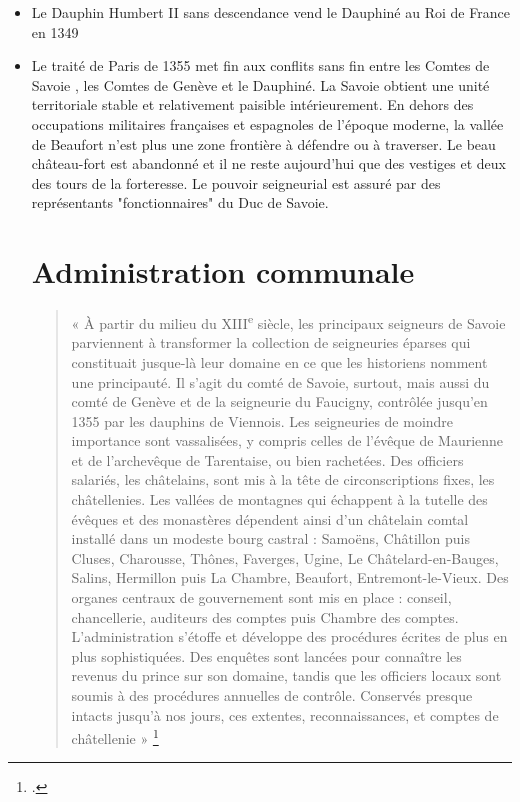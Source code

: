 \documentclass[12pt,a4paper]{report}
\begin{document}
\begin{itemize}
	\item Le Dauphin Humbert II sans descendance vend le Dauphiné au Roi de France en 1349
	\item Le traité de Paris de 1355 met fin aux conflits sans fin entre les Comtes de Savoie , les Comtes de Genève et le Dauphiné. 
	La Savoie obtient une unité territoriale stable et relativement paisible intérieurement. 
	En dehors des occupations militaires françaises et espagnoles de l'époque moderne, la vallée de Beaufort n'est plus une zone frontière à défendre ou à traverser. Le beau château-fort est abandonné et il ne reste aujourd'hui que des vestiges et deux des tours de la forteresse.
	Le pouvoir seigneurial est assuré par des représentants "fonctionnaires" du Duc de Savoie.
	
\section*{Administration communale}


\begin{quote}
	« À partir du milieu du XIII\textsuperscript{e} siècle, les principaux seigneurs de Savoie parviennent à transformer la collection de seigneuries éparses qui constituait jusque-là leur domaine en ce que les historiens nomment une principauté. Il s’agit du comté de Savoie, surtout, mais aussi du comté de Genève et de la seigneurie du Faucigny, contrôlée jusqu’en 1355 par les dauphins de Viennois. Les seigneuries de moindre importance sont vassalisées, y compris celles de l’évêque de Maurienne et de l’archevêque de Tarentaise, ou bien rachetées. Des officiers salariés, les châtelains, sont mis à la tête de circonscriptions fixes, les châtellenies. Les vallées de montagnes qui échappent à la tutelle des évêques et des monastères dépendent ainsi d’un châtelain comtal installé dans un modeste bourg castral : Samoëns, Châtillon puis Cluses, Charousse, Thônes, Faverges, Ugine, Le Châtelard-en-Bauges, Salins, Hermillon puis La Chambre, Beaufort, Entremont-le-Vieux. Des organes centraux de gouvernement sont mis en place : conseil, chancellerie, auditeurs des comptes puis Chambre des comptes. L’administration s’étoffe et développe des procédures écrites de plus en plus sophistiquées. Des enquêtes sont lancées pour connaître les revenus du prince sur son domaine, tandis que les officiers locaux sont soumis à des procédures annuelles de contrôle. Conservés presque intacts jusqu’à nos jours, ces extentes, reconnaissances, et comptes de châtellenie »
	\footcite[59]{Mouthon2016}
\end{quote}



\end{itemize}
\end{document}
